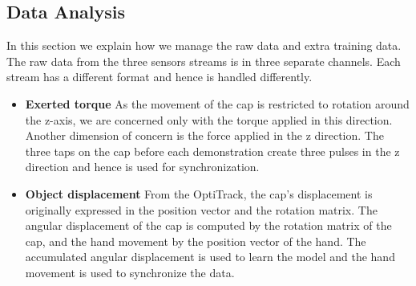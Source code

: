 \subsection{Data Analysis}
\label{dataanalysis}
In this section we explain how we manage the raw data and extra
training data.  The raw data from the three sensors streams is in
three separate channels. Each stream has a different format and hence
is handled differently.
\begin{itemize}
\item{\textbf{Exerted torque}}
\label{ftsensor}
As the movement of the cap is restricted to rotation around the
z-axis, we are concerned only with the torque applied in this direction.
Another dimension of concern is the force applied in the z direction. The
three taps on the cap before each demonstration create three
pulses in the z direction and hence is used for synchronization.
\item {\textbf{Object displacement}}
\label{sec:optiktrack}
From the OptiTrack, the cap's displacement is originally expressed in
the position vector and the rotation matrix. The angular
displacement of the cap is computed by the rotation matrix of the cap, and
the hand movement by the position vector of the hand. The accumulated
angular displacement is used to learn the model and the hand movement
is used to synchronize the data. %
%





\end{itemize}
